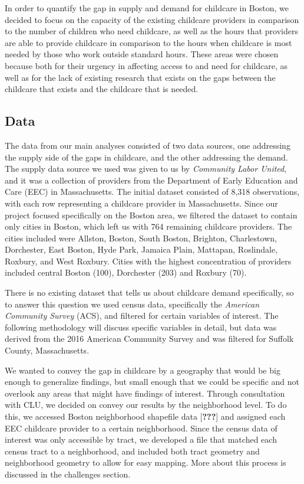 \documentclass[10pt,letterpaper]{article}
\begin{document}
In order to quantify the gap in supply and demand for childcare in
Boston, we decided to focus on the capacity of the existing childcare
providers in comparison to the number of children who need childcare, as
well as the hours that providers are able to provide childcare in
comparison to the hours when childcare is most needed by those who work
outside standard hours. These areas were chosen because both for their
urgency in affecting access to and need for childcare, as well as for
the lack of existing research that exists on the gaps between the
childcare that exists and the childcare that is needed.

\subsection{Data}\label{data}

The data from our main analyses consisted of two data sources, one
addressing the supply side of the gaps in childcare, and the other
addressing the demand. The supply data source we used was given to us by
\emph{Community Labor United}, and it was a collection of providers from
the Department of Early Education and Care (EEC) in Massachusetts. The
initial dataset consisted of 8,318 observations, with each row
representing a childcare provider in Massachusetts. Since our project
focused specifically on the Boston area, we filtered the dataset to
contain only cities in Boston, which left us with 764 remaining
childcare providers. The cities included were Allston, Boston, South
Boston, Brighton, Charlestown, Dorchester, East Boston, Hyde Park,
Jamaica Plain, Mattapan, Roslindale, Roxbury, and West Roxbury. Cities
with the highest concentration of providers included central Boston
(100), Dorchester (203) and Roxbury (70).

There is no existing dataset that tells us about childcare demand
specifically, so to answer this question we used census data,
specifically the \emph{American Community Survey} (ACS), and filtered
for certain variables of interest. The following methodology will
discuss specific variables in detail, but data was derived from the 2016
American Community Survey and was filtered for Suffolk County,
Massachusetts.

We wanted to convey the gap in childcare by a geography that would be
big enough to generalize findings, but small enough that we could be
specific and not overlook any areas that might have findings of
interest. Through consultation with CLU, we decided on convey our
results by the neighborhood level. To do this, we accessed Boston
neighborhood shapefile data {[}{\textbf{???}}{]} and assigned each EEC
childcare provider to a certain neighborhood. Since the census data of
interest was only accessible by tract, we developed a file that matched
each census tract to a neighborhood, and included both tract geometry
and neighborhood geometry to allow for easy mapping. More about this
process is discussed in the challenges section.
\end{document}
